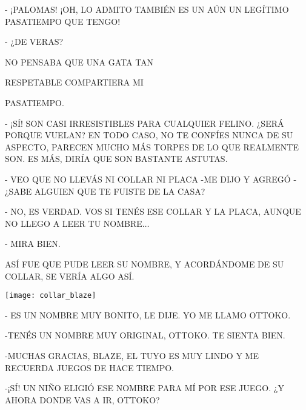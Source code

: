 - ¡PALOMAS! ¡OH, LO ADMITO TAMBIÉN ES UN AÚN UN LEGÍTIMO PASATIEMPO QUE TENGO! 

- ¿DE VERAS?

NO PENSABA QUE UNA GATA TAN 

RESPETABLE COMPARTIERA MI

PASATIEMPO.
\newline\newline	\newline 	

- ¡SÍ! SON CASI IRRESISTIBLES PARA CUALQUIER FELINO. ¿SERÁ PORQUE VUELAN? EN TODO CASO, NO TE CONFÍES NUNCA DE SU ASPECTO, PARECEN MUCHO MÁS TORPES DE LO QUE REALMENTE SON. ES MÁS, DIRÍA QUE SON BASTANTE ASTUTAS.




\newpage
{}
- VEO QUE NO LLEVÁS NI COLLAR NI PLACA -ME DIJO Y AGREGÓ -¿SABE ALGUIEN QUE TE FUISTE DE LA CASA?

- NO, ES VERDAD. VOS SI TENÉS ESE COLLAR Y LA PLACA, AUNQUE NO LLEGO A LEER TU NOMBRE$\ldots$

- MIRA BIEN.

ASÍ FUE QUE PUDE LEER SU NOMBRE, Y ACORDÁNDOME DE SU COLLAR, SE VERÍA ALGO ASÍ. 
\begin{center}
	\texttt{[image: collar\_blaze]}
\end{center}


- ES UN NOMBRE MUY BONITO, LE DIJE. YO ME LLAMO OTTOKO.






\newpage
{}
-TENÉS UN NOMBRE MUY ORIGINAL, OTTOKO. TE SIENTA BIEN.

-MUCHAS GRACIAS, BLAZE, EL TUYO ES MUY LINDO Y ME RECUERDA  JUEGOS DE HACE TIEMPO.

-¡SÍ! UN NIÑO ELIGIÓ ESE NOMBRE PARA MÍ POR ESE JUEGO. ¿Y AHORA DONDE VAS A IR, OTTOKO?

